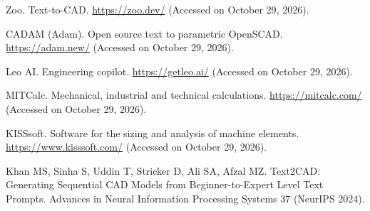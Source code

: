 \item[{[15]}] Zoo. Text-to-CAD. \url{https://zoo.dev/} (Accessed on October 29, 2026).
\item[{[16]}] CADAM (Adam). Open source text to parametric OpenSCAD. \url{https://adam.new/} (Accessed on October 29, 2026).
\item[{[17]}] Leo AI. Engineering copilot. \url{https://getleo.ai/} (Accessed on October 29, 2026).
\item[{[18]}] MITCalc. Mechanical, industrial and technical calculations. \url{https://mitcalc.com/} (Accessed on October 29, 2026).
\item[{[19]}] KISSsoft. Software for the sizing and analysis of machine elements. \url{https://www.kisssoft.com/} (Accessed on October 29, 2026).
\item[{[20]}] Khan MS, Sinha S, Uddin T, Stricker D, Ali SA, Afzal MZ. Text2CAD: Generating Sequential CAD Models from Beginner-to-Expert Level Text Prompts. Advances in Neural Information Processing Systems 37 (NeurIPS 2024).
